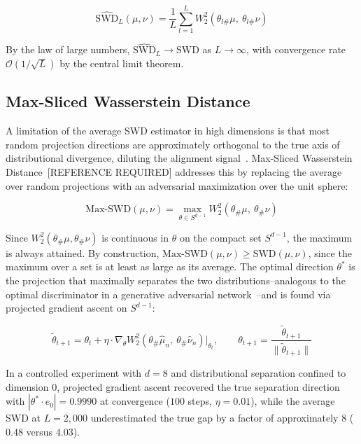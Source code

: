 \documentclass{article}
\begin{document}
	\begin{equation}
		\widehat{\mathrm{SWD}}_L(\mu, \nu) = \frac{1}{L} \sum_{l=1}^{L} 
		W_2^2\!\left(\theta_{l\#}\mu,\ \theta_{l\#}\nu\right)
		\label{eq:swd_estimator}
	\end{equation}
	
	By the law of large numbers, $\widehat{\mathrm{SWD}}_L \to \mathrm{SWD}$ as $L \to \infty$, with convergence rate $\mathcal{O}(1/\sqrt{L})$ by the central limit theorem.
	
	\subsection{Max-Sliced Wasserstein Distance}
	
	A limitation of the average SWD estimator in high dimensions is that most random projection directions are approximately orthogonal to the true axis of distributional divergence, diluting the alignment signal~\citep{ishan}. Max-Sliced Wasserstein Distance~[REFERENCE REQUIRED] addresses this by replacing the average over random projections with an adversarial maximization over the unit sphere:
	
	\begin{equation}
		\mathrm{Max\text{-}SWD}(\mu, \nu) = \max_{\theta \in S^{d-1}} 
		W_2^2\!\left(\theta_\#\mu,\ \theta_\#\nu\right)
		\label{eq:max_swd}
	\end{equation}
	
	Since $W_2^2(\theta_\#\mu, \theta_\#\nu)$ is continuous in $\theta$ on the compact set $S^{d-1}$, the maximum is always attained. By construction, $\mathrm{Max\text{-}SWD}(\mu, \nu) \geq \mathrm{SWD}(\mu, \nu)$, since the maximum over a set is at least as large as its average. The optimal direction $\theta^*$ is the projection that maximally separates the two distributions--analogous to the optimal discriminator in a generative adversarial network~\citep{goodfellow}--and is found via projected gradient ascent on $S^{d-1}$:
	
	\begin{equation}
		\tilde{\theta}_{t+1} = \theta_t + \eta \cdot 
		\nabla_\theta W_2^2\!\left(\theta_\#\hat{\mu}_n,\ 
		\theta_\#\hat{\nu}_n\right)\Big|_{\theta_t}, \qquad
		\theta_{t+1} = \frac{\tilde{\theta}_{t+1}}{\|\tilde{\theta}_{t+1}\|}
		\label{eq:pgd}
	\end{equation}
	
	In a controlled experiment with $d = 8$ and distributional separation confined to dimension $0$, projected gradient ascent recovered the true separation direction with $|\theta^* \cdot e_0| = 0.9990$ at convergence ($100$ steps, $\eta = 0.01$), while the average SWD at $L = 2{,}000$ underestimated the true gap by a factor of approximately $8$ ($0.48$ versus $4.03$).
	
\end{document}
